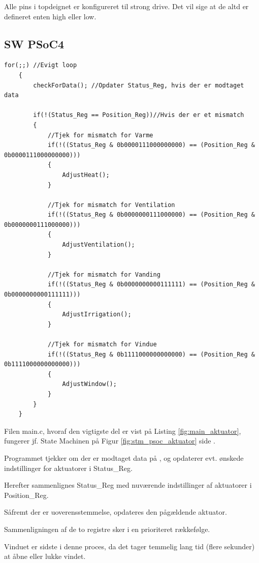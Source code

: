 Alle pins i topdeignet er konfigureret til strong drive. 
Det vil sige at de altd er defineret enten high eller low.

\subsection{SW PSoC4}

\begin{lstlisting}[caption=Udsnit af main.c for PSoC4 i Aktuator, label=fig:main_aktuator]
for(;;) //Evigt loop
    {
        checkForData(); //Opdater Status_Reg, hvis der er modtaget data
        
        if(!(Status_Reg == Position_Reg))//Hvis der er et mismatch
        {
            //Tjek for mismatch for Varme
            if(!((Status_Reg & 0b0000111000000000) == (Position_Reg & 0b0000111000000000)))
            {
                AdjustHeat();
            }
            
            //Tjek for mismatch for Ventilation
            if(!((Status_Reg & 0b0000000111000000) == (Position_Reg & 0b0000000111000000)))
            {
                AdjustVentilation();
            }
            
            //Tjek for mismatch for Vanding
            if(!((Status_Reg & 0b0000000000111111) == (Position_Reg & 0b0000000000111111)))
            {
                AdjustIrrigation();
            }
            
            //Tjek for mismatch for Vindue
            if(!((Status_Reg & 0b1111000000000000) == (Position_Reg & 0b1111000000000000)))
            {
                AdjustWindow();
            }
        }
    }
\end{lstlisting}

Filen main.c, hvoraf den vigtigste del er vist på Listing \ref{fig:main_aktuator}, fungerer jf. State Machinen på Figur \ref{fig:stm_psoc_aktuator} side \pageref{fig:stm_psoc_aktuator}.

Programmet tjekker om der er modtaget data på \IIC, og opdaterer evt. ønskede indstillinger for aktuatorer i Status\_Reg. 

Herefter sammenlignes Status\_Reg med nuværende indstillinger af aktuatorer i Position\_Reg.

Såfremt der er uoverensstemmelse, opdateres den pågældende aktuator. 

Sammenligningen af de to registre sker i en prioriteret rækkefølge. 

Vinduet er sidste i denne proces, da det tager temmelig lang tid (flere sekunder) at åbne eller lukke vindet. 

